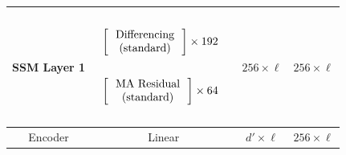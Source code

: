 \begin{table}[]
\begin{tabular}{@{}c|c|c|c@{}}
SSM Layer 1 & \begin{math}\begin{aligned}    \begin{matrix}    \text{\phantom{-}} \\    \end{matrix}    \\    &    \begin{bmatrix}    \text{\phantom{-} Differencing \phantom{-}}   \\ \text{(standard)} \\    \end{bmatrix}    \times 192     \\    \begin{matrix}    \text{\phantom{-}} \\    \end{matrix}    \\    &    \begin{bmatrix}    \text{\phantom{-} MA Residual\phantom{-} }   \\ \text{(standard)} \\    \end{bmatrix}     \times 64      \\     \begin{matrix}    \text{\phantom{-}} \\    \end{matrix}    \\\end{aligned}\end{math} & $256 \times \ell$ & $256 \times \ell$ \\ \midrule
Encoder     & Linear                                                                                                                                                                                                                                                                                                                                                                                                                                                                                                                                       & $d' \times \ell$  & $256 \times \ell$ \\ \bottomrule
\end{tabular}
\end{table}


